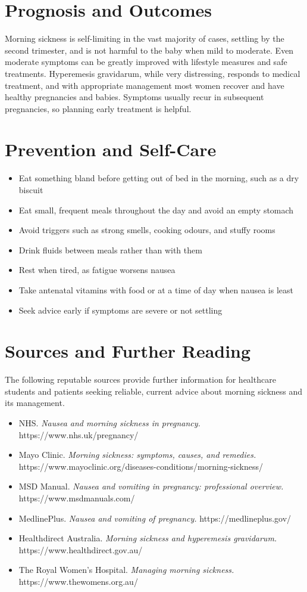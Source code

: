 \section*{Prognosis and Outcomes}
Morning sickness is self-limiting in the vast majority of cases, settling by the second trimester, and is not harmful to the baby when mild to moderate. Even moderate symptoms can be greatly improved with lifestyle measures and safe treatments. Hyperemesis gravidarum, while very distressing, responds to medical treatment, and with appropriate management most women recover and have healthy pregnancies and babies. Symptoms usually recur in subsequent pregnancies, so planning early treatment is helpful.

\section*{Prevention and Self-Care}
\begin{itemize}
    \item Eat something bland before getting out of bed in the morning, such as a dry biscuit
    \item Eat small, frequent meals throughout the day and avoid an empty stomach
    \item Avoid triggers such as strong smells, cooking odours, and stuffy rooms
    \item Drink fluids between meals rather than with them
    \item Rest when tired, as fatigue worsens nausea
    \item Take antenatal vitamins with food or at a time of day when nausea is least
    \item Seek advice early if symptoms are severe or not settling
\end{itemize}

\section*{Sources and Further Reading}
The following reputable sources provide further information for healthcare students and patients seeking reliable, current advice about morning sickness and its management.

\begin{itemize}
    \item NHS. \textit{Nausea and morning sickness in pregnancy.} https://www.nhs.uk/pregnancy/
    \item Mayo Clinic. \textit{Morning sickness: symptoms, causes, and remedies.} https://www.mayoclinic.org/diseases-conditions/morning-sickness/
    \item MSD Manual. \textit{Nausea and vomiting in pregnancy: professional overview.} https://www.msdmanuals.com/
    \item MedlinePlus. \textit{Nausea and vomiting of pregnancy.} https://medlineplus.gov/
    \item Healthdirect Australia. \textit{Morning sickness and hyperemesis gravidarum.} https://www.healthdirect.gov.au/
    \item The Royal Women's Hospital. \textit{Managing morning sickness.} https://www.thewomens.org.au/
\end{itemize}
